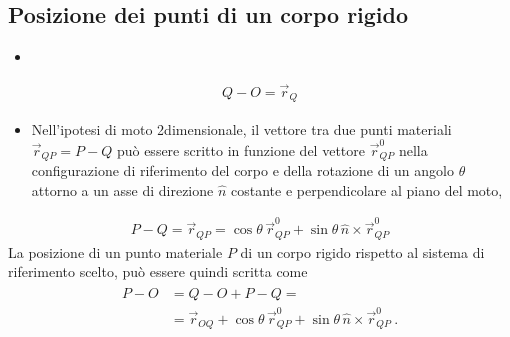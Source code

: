 \documentclass[letterpaper,10pt,italian]{jupyterBook}
\begin{document}
\subsection{Posizione dei punti di un corpo rigido}
\label{\detokenize{ch/mechanics/kinematics-rigid:posizione-dei-punti-di-un-corpo-rigido}}\begin{itemize}
\item {} 
\sphinxAtStartPar
{}

\end{itemize}
\begin{equation*}
\begin{split}Q - O = \vec{r}_Q\end{split}
\end{equation*}\begin{itemize}
\item {} 
\sphinxAtStartPar
{} Nell’ipotesi di moto 2\sphinxhyphen{}dimensionale, il vettore tra due punti materiali \(\vec{r}_{QP} = P-Q\) può essere scritto in funzione del vettore \(\vec{r}_{QP}^0\) nella configurazione di riferimento del corpo e della rotazione di un angolo \(\theta\) attorno a un asse di direzione \(\hat{n}\) costante e perpendicolare al piano del moto,

\end{itemize}
\begin{equation*}
\begin{split}P - Q = \vec{r}_{QP} = \cos \theta \, \vec{r}_{QP}^0 + \sin \theta \, \hat{n} \times \vec{r}_{QP}^0\end{split}
\end{equation*}
\sphinxAtStartPar
La posizione di un punto materiale \(P\) di un corpo rigido rispetto al sistema di riferimento scelto, può essere quindi scritta come
\begin{equation*}
\begin{split}\begin{aligned}
    P - O & = Q - O + P - Q = \\
          & = \vec{r}_{OQ} + \cos \theta \, \vec{r}_{QP}^0 + \sin \theta \, \hat{n} \times \vec{r}_{QP}^0  \ .
  \end{aligned}\end{split}
\end{equation*}
\end{document}
